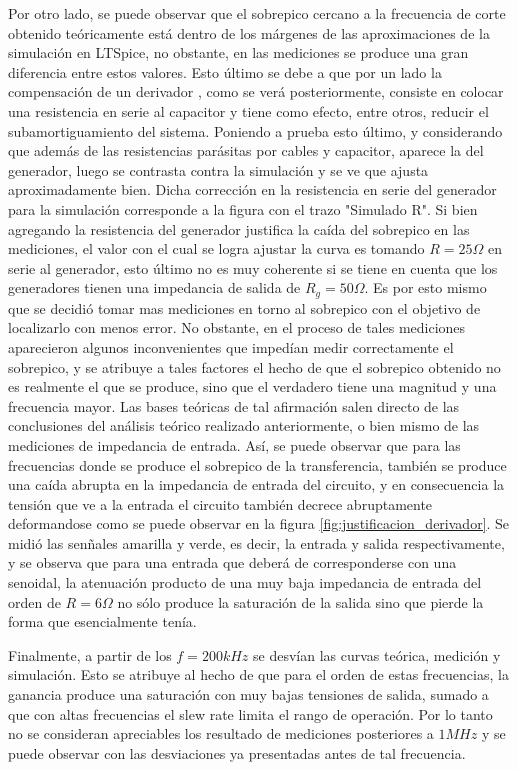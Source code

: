 Por otro lado, se puede observar que el sobrepico cercano a la frecuencia de corte obtenido te\'oricamente est\'a dentro de los m\'argenes de las aproximaciones
de la simulaci\'on en LTSpice, no obstante, en las mediciones se produce una gran diferencia entre estos valores. Esto \'ultimo se debe a que por un lado la compensaci\'on de un derivador
, como se ver\'a posteriormente, consiste en colocar una resistencia en serie al capacitor y tiene como efecto, entre otros, reducir el subamortiguamiento del sistema. Poniendo a prueba esto \'ultimo,
y considerando que adem\'as de las resistencias par\'asitas por cables y capacitor, aparece la del generador, luego se contrasta contra la simulaci\'on y se ve que ajusta aproximadamente bien. Dicha correcci\'on en
la resistencia en serie del generador para la simulaci\'on corresponde a la figura con el trazo "Simulado R".
Si bien agregando la resistencia del generador justifica la ca\'ida del sobrepico en las mediciones, el valor con el cual se logra ajustar la curva es tomando $R = 25 \Omega $ en serie
 al generador, esto \'ultimo no es muy coherente si se tiene en cuenta que los generadores tienen una impedancia de salida de $R_{g} = 50 \Omega $. Es por esto mismo que se decidi\'o tomar mas mediciones en torno al
 sobrepico con el objetivo de localizarlo con menos error. No obstante, en el proceso de tales mediciones aparecieron algunos inconvenientes que imped\'ian medir correctamente el sobrepico, y se atribuye a tales factores
 el hecho de que el sobrepico obtenido no es realmente el que se produce, sino que el verdadero tiene una magnitud y una frecuencia mayor. Las bases te\'oricas de tal afirmaci\'on salen directo de las conclusiones del an\'alisis
 te\'orico realizado anteriormente, o bien mismo de las mediciones de impedancia de entrada. As\'i, se puede observar que para las frecuencias donde se produce el sobrepico de la transferencia, tambi\'en se produce una ca\'ida abrupta
 en la impedancia de entrada del circuito, y en consecuencia la tensi\'on que ve a la entrada el circuito tambi\'en decrece abruptamente deformandose como se puede observar en la figura \ref{fig:justificacion_derivador}. Se midi\'o las 
 sen\~nales amarilla y verde, es decir, la entrada y salida respectivamente, y se observa que para una entrada que deber\'a de corresponderse con una senoidal, la atenuaci\'on producto de una muy baja impedancia de entrada del orden de $R = 6 \Omega$ 
 no s\'olo produce la saturaci\'on de la salida sino que pierde la forma que esencialmente ten\'ia.
 
 Finalmente, a partir de los $f = 200kHz$ se desv\'ian las curvas te\'orica, medici\'on y simulaci\'on. Esto se atribuye al hecho de que para el orden de estas frecuencias,
 la ganancia produce una saturaci\'on con muy bajas tensiones de salida, sumado a que con altas frecuencias el slew rate limita el rango de operaci\'on. Por lo tanto no se consideran
 apreciables los resultado de mediciones posteriores a $1MHz$ y se puede observar con las desviaciones ya presentadas antes de tal frecuencia.

